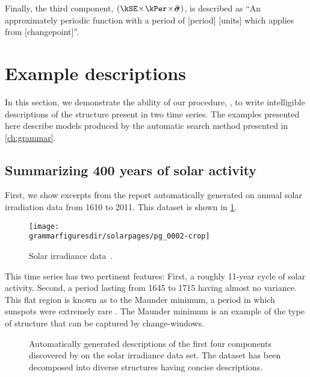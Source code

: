 Finally, the third component, $(\kSE \kerntimes \kPer \kerntimes \boldsymbol{\bar\sigma})$, is described as ``An approximately periodic function with a period of [period] [units] which applies from [changepoint]''.





\section{Example descriptions}
\label{sec:example-descriptions}
In this section, we demonstrate the ability of our procedure, \procedurename, to write intelligible descriptions of the structure present in two time series.
The examples presented here describe models produced by the automatic search method presented in \cref{ch:grammar}.


\subsection{Summarizing 400 years of solar activity}
\label{sec:solar}

First, we show excerpts from the report automatically generated on annual solar irradiation data from 1610 to 2011.
This dataset is shown in \cref{fig:solar}.
%
\begin{figure}[ht!]
\centering
\texttt{[image: \\grammarfiguresdir/solarpages/pg\_0002-crop]}
\caption[Solar irradiance dataset]
{Solar irradiance data~\citep{lean1995reconstruction}.}
\label{fig:solar}
\end{figure}

This time series has two pertinent features: 
First, a roughly 11-year cycle of solar activity.
Second, a period lasting from 1645 to 1715 having almost no variance.
This flat region is known as to the Maunder minimum, a period in which sunspots were extremely rare \citep{lean1995reconstruction}.
The Maunder minimum is an example of the type of structure that can be captured by change-windows.

\begin{figure}[ht!]
\centering
{}
\caption[Automatically-generated description of the solar irradiance data set]
{Automatically generated descriptions of the first four components discovered by \procedurename{} on the solar irradiance data set.
The dataset has been decomposed into diverse structures having concise descriptions.}
\label{fig:exec}
\end{figure}

